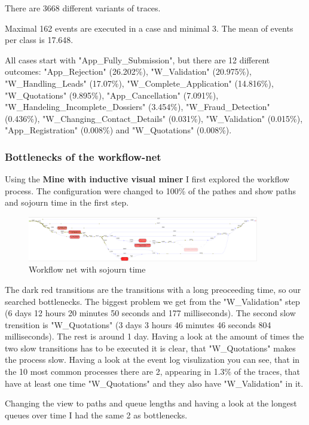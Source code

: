 There are 3668 different variants of traces.

Maximal 162 events are executed in a case and minimal 3. The mean of events per class is 17.648.

All cases start with "App\_Fully\_Submission", but there are 12 different outcomes: 
"App\_Rejection" (26.202\%), "W\_Validation" (20.975\%), "W\_Handling\_Leads" (17.07\%), "W\_Complete\_Application" (14.816\%), "W\_Quotations" (9.895\%), "App\_Cancellation" (7.091\%), "W\_Handeling\_Incomplete\_Dossiers" (3.454\%), "W\_Fraud\_Detection" (0.436\%), "W\_Changing\_Contact\_Details" (0.031\%), "W\_Validation" (0.015\%), "App\_Registration" (0.008\%) and "W\_Quotations" (0.008\%).

\subsubsection{Bottlenecks of the workflow-net}
Using the \textbf{Mine with inductive visual miner} I first explored the workflow process. The configuration were changed to 100\% of the pathes and show paths and sojourn time in the first step.

\begin{figure}[!htbp]
\centering
\includegraphics[width = 0.9\textwidth]{WorkSojuComp.PNG}
\caption{Workflow net with sojourn time}
\label{fig: WorkSojuComp}
\end{figure}

The dark red transitions are the transitions with a long preoceeding time, so our searched bottlenecks. The biggest problem we get from the "W\_Validation" step (6 days 12 hours 20 minutes 50 seconds and 177 milliseconds). The second slow trensition is "W\_Quotations" (3 days 3 hours 46 minutes 46 seconds 804 milliseconds). The rest is around 1 day. Having a look at the amount of times the two slow transitions has to be executed it is clear, that "W\_Quotations" makes the process slow. Having a look at the event log visulization you can see, that in the 10 most common processes there are 2, appearing in 1.3\% of the traces, that have at least one time  "W\_Quotations" and they also have "W\_Validation" in it. 

Changing the view to paths and queue lengths and having a look at the longest queues over time I had the same 2 as bottlenecks.

